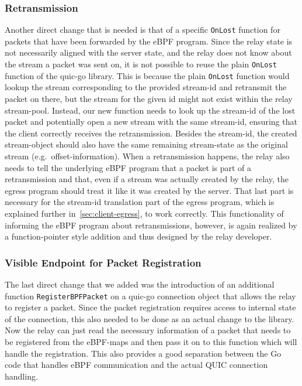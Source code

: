 \subsubsection*{Retransmission}
Another direct change that is needed is that of a specific \verb|OnLost| function for packets that 
have been forwarded by the eBPF program.
Since the relay state is not necessarily aligned with the server state, and the relay does not know
about the stream a packet was sent on, it is not possible to reuse the plain \verb|OnLost| function
of the quic-go library.
This is because the plain \verb|OnLost| function would lookup the stream corresponding to the provided stream-id and 
retransmit the packet on there, but the stream for the given id might not exist within the relay stream-pool.
Instead, our new function needs to look up the stream-id of the lost packet and potentially open a new stream with
the same stream-id, ensuring that the client correctly receives the retransmission.
Besides the stream-id, the created stream-object should also have the same remaining stream-state
as the original stream (e.g.~offset-information).  
When a retransmission happens, the relay also needs to tell the underlying eBPF program that a packet is part of a 
retransmission and that, even if a stream was actually created by the relay, the egress program should treat it like 
it was created by the server.
That last part is necessary for the stream-id translation part of the egress program, which is explained further
in~\autoref{sec:client-egress}, to work correctly.
This functionality of informing the eBPF program about retransmissions, however, is again realized by a 
function-pointer style addition and thus designed by the relay developer.

\subsubsection*{Visible Endpoint for Packet Registration}
The last direct change that we added was the introduction of an additional function \verb|RegisterBPFPacket| 
on a quic-go connection object that allows the relay to register a packet.
Since the packet registration requires access to internal state of the connection, this also needed to be 
done as an actual change to the library.
Now the relay can just read the necessary information of a packet that needs to be registered
from the eBPF-maps and then pass it on to this function which will handle the registration.
This also provides a good separation between the Go code that handles eBPF communication and the actual
QUIC connection handling.